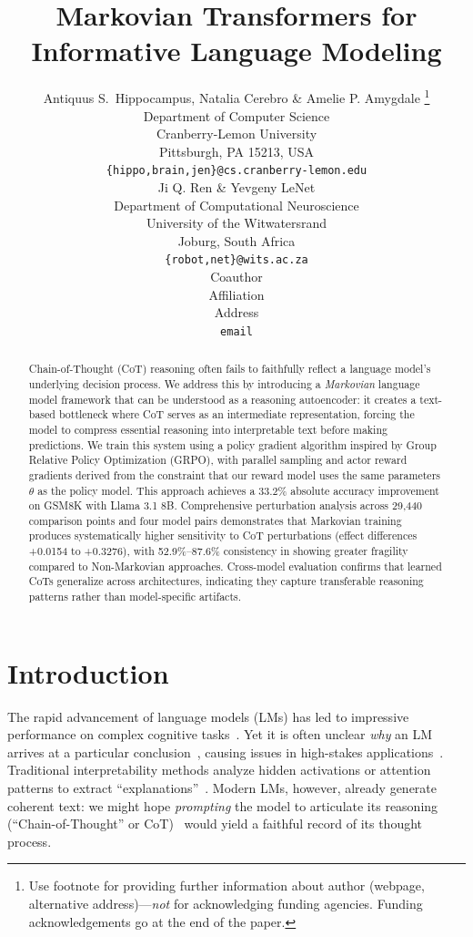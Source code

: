 \documentclass{article} %
\title{Markovian Transformers for Informative Language Modeling}
\author{Antiquus S.~Hippocampus, Natalia Cerebro \& Amelie P. Amygdale \thanks{ Use footnote for providing further information
about author (webpage, alternative address)---\emph{not} for acknowledging
funding agencies.  Funding acknowledgements go at the end of the paper.} \\
Department of Computer Science\\
Cranberry-Lemon University\\
Pittsburgh, PA 15213, USA \\
\texttt{\{hippo,brain,jen\}@cs.cranberry-lemon.edu} \\
\And
Ji Q. Ren \& Yevgeny LeNet \\
Department of Computational Neuroscience \\
University of the Witwatersrand \\
Joburg, South Africa \\
\texttt{\{robot,net\}@wits.ac.za} \\
\AND
Coauthor \\
Affiliation \\
Address \\
\texttt{email}
}
\begin{document}
\maketitle

\begin{abstract}
Chain-of-Thought (CoT) reasoning often fails to faithfully reflect a language model's underlying decision process. We address this by introducing a \emph{Markovian} language model framework that can be understood as a reasoning autoencoder: it creates a text-based bottleneck where CoT serves as an intermediate representation, forcing the model to compress essential reasoning into interpretable text before making predictions. We train this system using a policy gradient algorithm inspired by Group Relative Policy Optimization (GRPO), with parallel sampling and actor reward gradients derived from the constraint that our reward model uses the same parameters $\theta$ as the policy model. This approach achieves a 33.2\% absolute accuracy improvement on GSM8K with Llama 3.1 8B. Comprehensive perturbation analysis across 29,440 comparison points and four model pairs demonstrates that Markovian training produces systematically higher sensitivity to CoT perturbations (effect differences +0.0154 to +0.3276), with 52.9\%--87.6\% consistency in showing greater fragility compared to Non-Markovian approaches. Cross-model evaluation confirms that learned CoTs generalize across architectures, indicating they capture transferable reasoning patterns rather than model-specific artifacts.
\end{abstract}

\section{Introduction}
\label{sec:intro}
The rapid advancement of language models (LMs) has led to impressive performance on complex cognitive tasks~\citep{NEURIPS2020_1457c0d6}. Yet it is often unclear \emph{why} an LM arrives at a particular conclusion~\citep{lamparth2023analyzing,burns2024discovering,gurnee2024language}, causing issues in high-stakes applications~\citep{Grabb2024.04.07.24305462,lamparth2024human,rivera2024escalation}. Traditional interpretability methods analyze hidden activations or attention patterns to extract ``explanations''~\citep{geiger2022inducing,geva2022transformer,meng2022locating,raukur2022toward,wang2022interpretability,lamparth2023analyzing,nanda2023progress}. Modern LMs, however, already generate coherent text: we might hope \emph{prompting} the model to articulate its reasoning (``Chain-of-Thought'' or CoT)~\citep{nye2022show,wei2022chain} would yield a faithful record of its thought process. 
\end{document}
